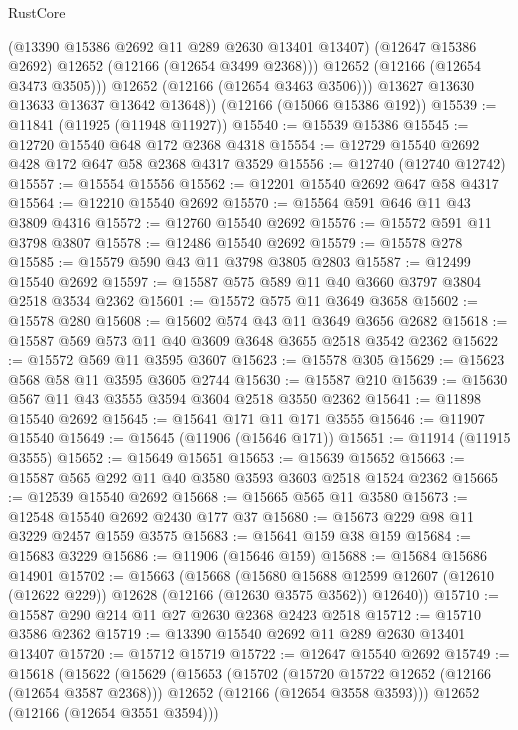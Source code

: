 \begin{lexlean}{RustCore}
\begin{coremodule}
              (@13390 @15386 @2692 @11 @289 @2630 @13401 @13407)
              (@12647 @15386 @2692)
              @12652
              (@12166 (@12654 @3499 @2368)))
            @12652
            (@12166 (@12654 @3473 @3505)))
          @12652
          (@12166 (@12654 @3463 @3506)))
        @13627
        @13630
        @13633
        @13637
        @13642
        @13648))
    (@12166 (@15066 @15386 @192))
@15539 := @11841 (@11925 (@11948 @11927))
@15540 := @15539 @15386
@15545 := @12720 @15540 @648 @172 @2368 @4318
@15554 := @12729 @15540 @2692 @428 @172 @647 @58 @2368 @4317 @3529
@15556 := @12740 (@12740 @12742)
@15557 := @15554 @15556
@15562 := @12201 @15540 @2692 @647 @58 @4317
@15564 := @12210 @15540 @2692
@15570 := @15564 @591 @646 @11 @43 @3809 @4316
@15572 := @12760 @15540 @2692
@15576 := @15572 @591 @11 @3798 @3807
@15578 := @12486 @15540 @2692
@15579 := @15578 @278
@15585 := @15579 @590 @43 @11 @3798 @3805 @2803
@15587 := @12499 @15540 @2692
@15597 := @15587 @575 @589 @11 @40 @3660 @3797 @3804 @2518 @3534 @2362
@15601 := @15572 @575 @11 @3649 @3658
@15602 := @15578 @280
@15608 := @15602 @574 @43 @11 @3649 @3656 @2682
@15618 := @15587 @569 @573 @11 @40 @3609 @3648 @3655 @2518 @3542 @2362
@15622 := @15572 @569 @11 @3595 @3607
@15623 := @15578 @305
@15629 := @15623 @568 @58 @11 @3595 @3605 @2744
@15630 := @15587 @210
@15639 := @15630 @567 @11 @43 @3555 @3594 @3604 @2518 @3550 @2362
@15641 := @11898 @15540 @2692
@15645 := @15641 @171 @11 @171 @3555
@15646 := @11907 @15540
@15649 := @15645 (@11906 (@15646 @171))
@15651 := @11914 (@11915 @3555)
@15652 := @15649 @15651
@15653 := @15639 @15652
@15663 := @15587 @565 @292 @11 @40 @3580 @3593 @3603 @2518 @1524 @2362
@15665 := @12539 @15540 @2692
@15668 := @15665 @565 @11 @3580
@15673 := @12548 @15540 @2692 @2430 @177 @37
@15680 := @15673 @229 @98 @11 @3229 @2457 @1559 @3575
@15683 := @15641 @159 @38 @159
@15684 := @15683 @3229
@15686 := @11906 (@15646 @159)
@15688 := @15684 @15686 @14901
@15702 := @15663
    (@15668
      (@15680
        @15688
        @12599
        @12607
        (@12610 (@12622 @229))
        @12628
        (@12166 (@12630 @3575 @3562))
        @12640))
@15710 := @15587 @290 @214 @11 @27 @2630 @2368 @2423 @2518
@15712 := @15710 @3586 @2362
@15719 := @13390 @15540 @2692 @11 @289 @2630 @13401 @13407
@15720 := @15712 @15719
@15722 := @12647 @15540 @2692
@15749 := @15618
    (@15622
      (@15629
        (@15653
          (@15702
            (@15720 @15722 @12652 (@12166 (@12654 @3587 @2368)))
            @12652
            (@12166 (@12654 @3558 @3593)))
          @12652
          (@12166 (@12654 @3551 @3594)))

\end{coremodule}
\end{lexlean}
